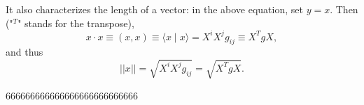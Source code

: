 It also characterizes the length of a vector: in the above
equation, set $y=x$. Then ("$^T$" stands for the transpose),
\begin{equation}
x\cdot x\equiv (x,x)\equiv \langle x\mid x\rangle
=X^iX^j g_{ij}\equiv X^T g X,
\end{equation}
and thus
\begin{equation}
\vert\vert  x\vert\vert  =\sqrt{X^iX^j g_{ij}}= \sqrt{X^T g X}.
\end{equation}

666666666666666666666666666
